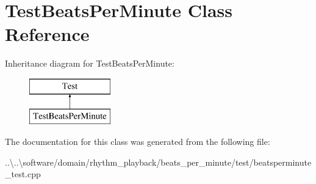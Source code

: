 \hypertarget{class_test_beats_per_minute}{}\section{Test\+Beats\+Per\+Minute Class Reference}
\label{class_test_beats_per_minute}
Inheritance diagram for Test\+Beats\+Per\+Minute\+:\begin{figure}[H]
\begin{center}
\leavevmode
\includegraphics[height=2.000000cm]{class_test_beats_per_minute}
\end{center}
\end{figure}


The documentation for this class was generated from the following file\+:\begin{DoxyCompactItemize}
\item 
..\textbackslash{}..\textbackslash{}software/domain/rhythm\+\_\+playback/beats\+\_\+per\+\_\+minute/test/beatsperminute\+\_\+test.\+cpp\end{DoxyCompactItemize}
